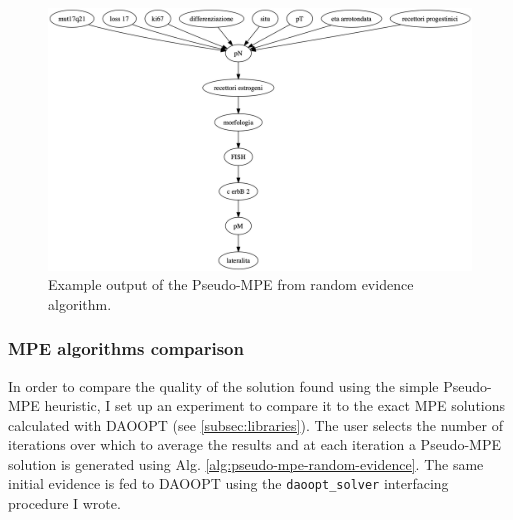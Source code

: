 \begin{figure}[htbp]
\centerline{\includegraphics[width=\columnwidth]{methodology/images/pseudo-mpe-random-example}}
\caption{Example output of the Pseudo-MPE from random evidence algorithm.}
\label{fig:pseudo-mpe-random}
\end{figure}

\subsubsection{MPE algorithms comparison}
In order to compare the quality of the solution found using the simple Pseudo-MPE heuristic, I set up an experiment to compare it to the exact MPE solutions calculated with DAOOPT (see \ref{subsec:libraries}).
The user selects the number of iterations over which to average the results and at each iteration a Pseudo-MPE solution is generated using Alg. \ref{alg:pseudo-mpe-random-evidence}.
The same initial evidence is fed to DAOOPT using the \texttt{daoopt\_solver} interfacing procedure I wrote.

